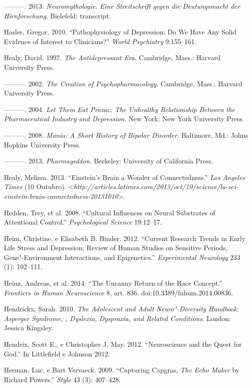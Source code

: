 ---------. 2013. \emph{Neuromythologie. Eine Streitschrift gegen die
Deutungsmacht der Hirnforschung}. Bielefeld: transcript.

Hasler, Gregor, 2010. ``Pathophysiology of Depression: Do We Have Any
Solid Evidence of Interest to Clinicians?'' \emph{World Psychiatry}
9:155--161.

Healy, David. 1997. \emph{The Antidepressant Era}. Cambridge, Mass.:
Harvard University Press.

---------. 2002. \emph{The Creation of Psychopharmacology}. Cambridge,
Mass.: Harvard University Press.

---------. 2004. \emph{Let Them Eat Prozac: The Unhealthy Relationship
Between the Pharmaceutical Industry and Depression}. New York: New York
University Press.

---------. 2008. \emph{Mania: A Short History of Bipolar Disorder}.
Baltimore, Md.: Johns Hopkins University Press.

---------. 2013. \emph{Pharmageddon}. Berkeley: University of California
Press.

Healy, Melissa. 2013. ``Einstein's Brain a Wonder of Connectedness.''
\emph{Los Angeles Times} (10 Outubro).
\textless{}\emph{http://articles.latimes.com/2013/oct/10/science/la-sci-einstein-brain-connectedness-20131010}\textgreater{}.

Hedden, Trey, et al. 2008. ``Cultural Influences on Neural Substrates of
Attentional Control.'' \emph{Psychological Science} 19:12--17.

Heim, Christine, e Elisabeth B. Binder. 2012. ``Current Research Trends
in Early Life Stress and Depression: Review of Human Studies on
Sensitive Periods, Gene"-Environment Interactions, and Epigenetics.''
\emph{Experimental Neurology} 233 (1): 102--111.

Heinz, Andreas, et al. 2014. ``The Uncanny Return of the Race Concept.''
\emph{Frontiers in Human Neuroscience} 8, art. 836.
doi:10.3389/fnhum.2014.00836.

Hendrickx, Sarah. 2010. \emph{The Adolescent and Adult Neuro"-Diversity
Handbook: Asperger Syndrome, , Dyslexia, Dyspraxia, and Related
Conditions}. London: Jessica Kingsley.

Hendrix, Scott E., e Christopher J. May. 2012. ``Neuroscience and the
Quest for God.'' In Littlefield e Johnson 2012.

Herman, Luc, e Bart Vervaeck. 2009. ``Capturing Capgras, \emph{The Echo
Maker} by Richard Powers.'' \emph{Style} 43 (3): 407--428.


